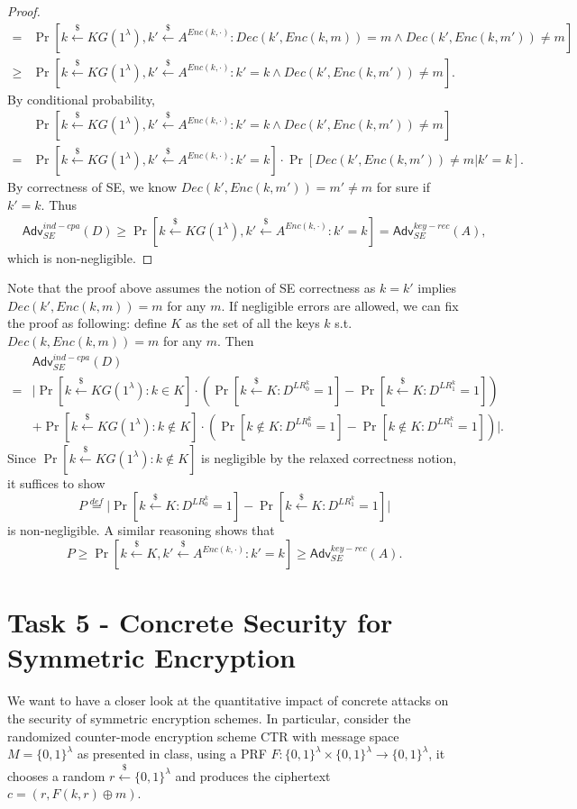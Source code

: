 \documentclass[12pt]{article}
\newcommand{\eqdef}{\stackrel{def}{=}}
\newcommand{\bits}{\{0,1\}}
\newcommand{\getsr}{\stackrel{\$}{\gets}}
\newcommand{\Adv}{\textsf{Adv}}
\theoremstyle{definition}
\begin{document}
\begin{proof}
$$\begin{aligned}
=& \Pr[k \getsr KG(1^\lambda), k' \getsr A^{Enc(k,\cdot)}: Dec(k', Enc(k, m))=m \wedge Dec(k', Enc(k, m'))\not=m] \\
\geq & \Pr[k \getsr KG(1^\lambda), k' \getsr A^{Enc(k,\cdot)}: k' = k \wedge Dec(k', Enc(k, m'))\not=m].
\end{aligned}$$
By conditional probability,
$$\begin{aligned}
&\Pr[k \getsr KG(1^\lambda), k' \getsr A^{Enc(k,\cdot)}: k' = k \wedge Dec(k', Enc(k, m'))\not=m] \\
=&\Pr[k \getsr KG(1^\lambda), k' \getsr A^{Enc(k,\cdot)}: k' = k] \cdot \Pr[Dec(k', Enc(k, m'))\not=m | k' = k].
\end{aligned}$$
By correctness of SE, we know $Dec(k', Enc(k, m')) = m' \not= m$ for sure if $k'=k$. Thus
$$\begin{aligned}
&\Adv_{SE}^{ind-cpa}(D) 
\geq  \Pr[k \getsr KG(1^\lambda), k' \getsr A^{Enc(k,\cdot)}: k' = k] 
= \Adv_{SE}^{key-rec}(A),
\end{aligned}$$
which is non-negligible.
\end{proof}
Note that the proof above assumes the notion of SE correctness as $k=k'$ implies $Dec(k', Enc(k, m)) = m$ for any $m$. If negligible errors are allowed, we can fix the proof as following: define $K$ as the set of all the keys $k$ s.t. $Dec(k, Enc(k, m)) = m$ for any $m$. 
Then
$$\begin{aligned}
&\Adv_{SE}^{ind-cpa}(D) \\
=& \bigg| \Pr[k \getsr KG(1^\lambda) : k \in K]\cdot(\Pr[k\getsr K : D^{LR_0^k}=1] - \Pr[k\getsr K : D^{LR_1^k}=1]) \\
& + \Pr[k \getsr KG(1^\lambda) : k \not\in K]\cdot(\Pr[k\not\in K : D^{LR_0^k}=1] - \Pr[k\not\in K : D^{LR_1^k}=1]) \bigg|.
\end{aligned}$$
Since $\Pr[k \getsr KG(1^\lambda) : k \not\in K]$ is negligible by the relaxed correctness notion, it suffices to show
$$P \eqdef \bigg| \Pr[k\getsr K : D^{LR_0^k}=1] - \Pr[k\getsr K : D^{LR_1^k}=1] \bigg|$$
is non-negligible.
A similar reasoning shows that
$$P
\geq \Pr[k \getsr K, k' \getsr A^{Enc(k,\cdot)}: k' = k] 
\geq \Adv_{SE}^{key-rec}(A).$$

\section{Task 5 - Concrete Security for Symmetric Encryption}
We want to have a closer look at the quantitative impact of concrete attacks on the security
of symmetric encryption schemes. In particular, consider the randomized counter-mode
encryption scheme CTR with message space $M = \bits^\lambda$ as presented in class, using a
PRF $F : \bits^\lambda \times \bits^\lambda \to \bits^\lambda$, it chooses a random $r \getsr \bits^\lambda$
and produces the ciphertext $c = (r, F(k, r) \oplus m)$.
\end{document}
